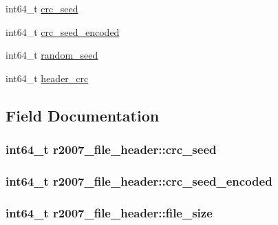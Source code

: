 \begin{DoxyCompactItemize}
\item 
int64\-\_\-t \hyperlink{structr2007__file__header_a76ea23718d97c61cb2d0125aae2a72a1}{crc\-\_\-seed}
\item 
int64\-\_\-t \hyperlink{structr2007__file__header_a7ca55cfc714fcb573f00f5266cf8851c}{crc\-\_\-seed\-\_\-encoded}
\item 
int64\-\_\-t \hyperlink{structr2007__file__header_a2c5181130456d72eb2e4f6413214a751}{random\-\_\-seed}
\item 
int64\-\_\-t \hyperlink{structr2007__file__header_ac2cb865419cd08f680d89b960aeeb1f1}{header\-\_\-crc}
\end{DoxyCompactItemize}


\subsection{\-Field \-Documentation}
\hypertarget{structr2007__file__header_a76ea23718d97c61cb2d0125aae2a72a1}{
\subsubsection[{crc\-\_\-seed}]{\setlength{\rightskip}{0pt plus 5cm}int64\-\_\-t {\bf r2007\-\_\-file\-\_\-header\-::crc\-\_\-seed}}}\label{structr2007__file__header_a76ea23718d97c61cb2d0125aae2a72a1}
\hypertarget{structr2007__file__header_a7ca55cfc714fcb573f00f5266cf8851c}{
\subsubsection[{crc\-\_\-seed\-\_\-encoded}]{\setlength{\rightskip}{0pt plus 5cm}int64\-\_\-t {\bf r2007\-\_\-file\-\_\-header\-::crc\-\_\-seed\-\_\-encoded}}}\label{structr2007__file__header_a7ca55cfc714fcb573f00f5266cf8851c}
\hypertarget{structr2007__file__header_a175d522088e44b31968fab84e6bd3b27}{
\subsubsection[{file\-\_\-size}]{\setlength{\rightskip}{0pt plus 5cm}int64\-\_\-t {\bf r2007\-\_\-file\-\_\-header\-::file\-\_\-size}}}\label{structr2007__file__header_a175d522088e44b31968fab84e6bd3b27}
